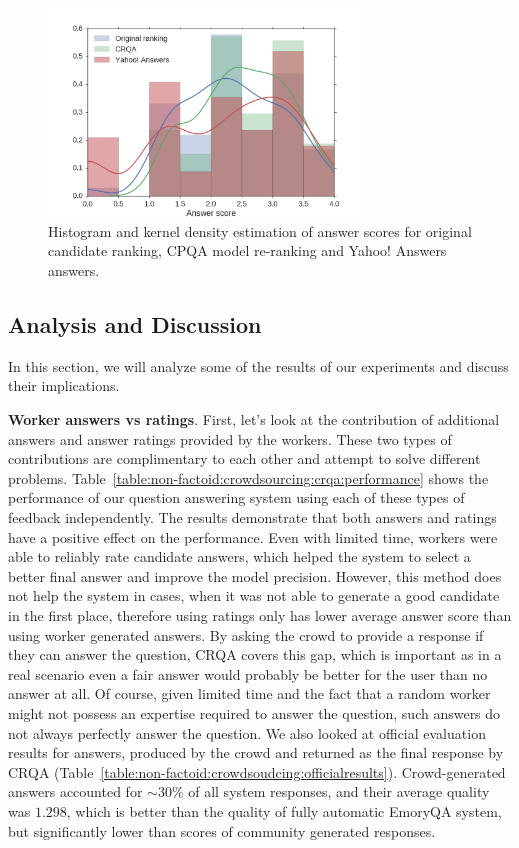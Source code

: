 \begin{figure}[h]
    \centering
    \includegraphics[width=0.75\textwidth]{img/crqa_score_hist}
    \caption{Histogram and kernel density estimation of answer scores for original candidate ranking, CPQA model re-ranking and Yahoo! Answers answers.}
    \label{figure:non-factoid:crowdsourcing:crqa:score_histogram}
\end{figure}

\subsection{Analysis and Discussion}
\label{section:non-factoid:crowdsourcing:analysis}

In this section, we will analyze some of the results of our experiments and discuss their implications.

\textbf{Worker answers vs ratings}.
First, let's look at the contribution of additional answers and answer ratings provided by the workers.
These two types of contributions are complimentary to each other and attempt to solve different problems.
Table~\ref{table:non-factoid:crowdsourcing:crqa:performance} shows the performance of our question answering system using each of these types of feedback independently.
The results demonstrate that both answers and ratings have a positive effect on the performance.
Even with limited time, workers were able to reliably rate candidate answers, which helped the system to select a better final answer and improve the model precision.
However, this method does not help the system in cases, when it was not able to generate a good candidate in the first place, therefore using ratings only has lower average answer score than using worker generated answers.
By asking the crowd to provide a response if they can answer the question, CRQA covers this gap, which is important as in a real scenario even a fair answer would probably be better for the user than no answer at all.
Of course, given limited time and the fact that a random worker might not possess an expertise required to answer the question, such answers do not always perfectly answer the question.
We also looked at official evaluation results for answers, produced by the crowd and returned as the final response by CRQA (Table~\ref{table:non-factoid:crowdsoudcing:officialresults}).
Crowd-generated answers accounted for $\sim 30\%$ of all system responses, and their average quality was $1.298$, which is better than the quality of fully automatic EmoryQA system, but significantly lower than scores of community generated responses.

